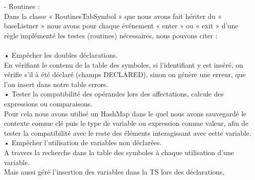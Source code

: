 \documentclass[12pt]{article}
\begin{document}
\color{blue}
-	Routines :\\
\color{black}
Dans la classe « RoutinesTabSymbol » que nous avons fait hériter du « baseListner » nous avons pour chaque événement « enter » ou « exit » d'une règle implémenté les testes (routines) nécessaires, nous pouvons citer :\\
\texttt{ }\\
•	Empêcher les doubles déclarations.\\
En vérifiant le contenu de la table des symboles, si l'identifiant y est inséré, on vérifie s'il à été déclaré (champs DECLARED), sinon on génère une erreur, que l'on insert dans notre table errors.\\ 
•	Tester la compatibilité des opérandes lors des affectations, calcule des expressions ou comparaisons.\\
Pour cela nous avons utilisé un HashMap dans le quel nous avons sauvegardé le contexte comme clé puis le type de variable ou expression comme valeur, afin de tester la compatibilité avec le reste des éléments interagissant avec cette variable.\\
•	Empêcher l'utilisation de variables non déclarées.\\
A travers la recherche dans la table des symboles à chaque utilisation d'une variable.\\

Mais aussi géré l'insertion des variables dans la TS lors des déclarations, \\
\end{document}
